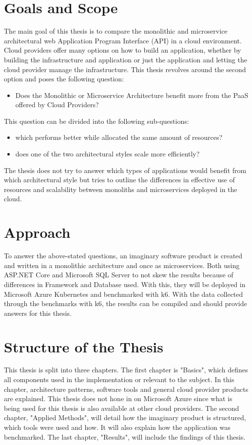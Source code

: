 \documentclass[BIF,Bachelor,nenglish]{twbook}%
\begin{document}
\section{Goals and Scope}
The main goal of this thesis is to compare the monolithic and microservice architectural web Application Program Interface (API) in a cloud environment. Cloud providers offer many options on how to build an application, whether by building the infrastructure and application or just the application and letting the cloud provider manage the infrastructure. This thesis revolves around the second option and poses the following question:

\begin{itemize}
\item Does the Monolithic or Microservice Architecture benefit more from the PaaS offered by Cloud Providers?
\end{itemize}

\noindent
This question can be divided into the following sub-questions:

\begin{itemize}
\item which performs better while allocated the same amount of resources?
\item does one of the two architectural styles scale more efficiently?
\end{itemize}

The thesis does not try to answer which types of applications would benefit from which architectural style but tries to outline the differences in effective use of resources and scalability between monoliths and microservices deployed in the cloud.

\section{Approach}
To answer the above-stated questions, an imaginary software product is created and written in a monolithic architecture and once as microservices. Both using ASP.NET Core and Microsoft SQL Server to not skew the results because of differences in Framework and Database used. With this, they will be deployed in Microsoft Azure Kubernetes and benchmarked with k6. With the data collected through the benchmarks with k6, the results can be compiled and should provide answers for this thesis.

\section{Structure of the Thesis}
This thesis is split into three chapters. The first chapter is "Basics", which defines all components used in the implementation or relevant to the subject. In this chapter, architecture patterns, software tools and general cloud provider products are explained. This thesis does not hone in on Microsoft Azure since what is being used for this thesis is also available at other cloud providers. The second chapter, "Applied Methods", will detail how the imaginary product is structured, which tools were used and how. It will also explain how the application was benchmarked. The last chapter, "Results", will include the findings of this thesis.
\end{document}
